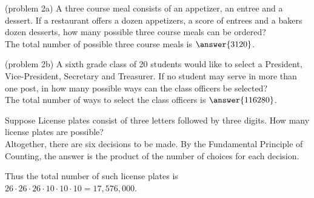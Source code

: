 \documentclass[handout]{ximera}
\begin{document}
\begin{problem}(problem 2a)
A three course meal consists of an appetizer, an entree and a dessert. 
If a restaurant offers a dozen appetizers, a score of entrees and a bakers dozen desserts, 
how many possible three course meals can be ordered?\\
The total number of possible three course meals is $\answer{3120}$.
\end{problem}

\begin{problem}(problem 2b)
A sixth grade class of 20 students would like to select a President, Vice-President, Secretary and Treasurer.
If no student may serve in more than one post, in how many possible ways can the class officers be selected?\\
The total number of ways to select the class officers is $\answer{116280}$.
\end{problem}


\begin{example}[example 3]
Suppose License plates consist of three letters followed by three digits. How many license plates are possible?\\
Altogether, there are six decisions to be made. By the Fundamental Principle of Counting, the answer is the
product of the number of choices for each decision.

\begin{image}
\end{image}
Thus the total number of such license plates is $26 \cdot 26 \cdot 26 \cdot 10\cdot 10\cdot 10 = 17,576,000$.

\end{example}
\end{document}
